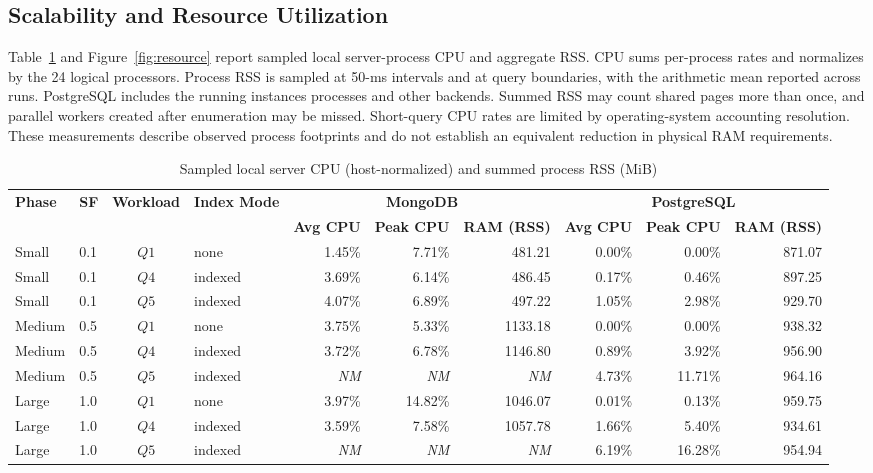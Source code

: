 \documentclass[10pt,a4paper,twocolumn]{article}
\begin{document}
\subsection{Scalability and Resource Utilization}
Table~\ref{tab:resources} and Figure~\ref{fig:resource} report sampled local server-process CPU and aggregate RSS. CPU sums per-process rates and normalizes by the 24 logical processors. Process RSS is sampled at 50-ms intervals and at query boundaries, with the arithmetic mean reported across runs. PostgreSQL includes the running instance\textquotesingle s processes and other backends. Summed RSS may count shared pages more than once, and parallel workers created after enumeration may be missed. Short-query CPU rates are limited by operating-system accounting resolution. These measurements describe observed process footprints and do not establish an equivalent reduction in physical RAM requirements.

\begin{table}[t]
\caption{Sampled local server CPU (host-normalized) and summed process RSS (MiB)}
\label{tab:resources}
\centering\small
\renewcommand{\arraystretch}{1.2}
\begin{adjustbox}{max width=\textwidth}
\begin{tabular}{@{}llclrrrrrr@{}}
\toprule
\textbf{Phase} & \textbf{SF} & \textbf{Workload} & \textbf{Index Mode}
  & \multicolumn{3}{c}{\textbf{MongoDB}}
  & \multicolumn{3}{c}{\textbf{PostgreSQL}} \\
\cmidrule(lr){5-7}\cmidrule(lr){8-10}
 & & & & \textbf{Avg CPU} & \textbf{Peak CPU} & \textbf{RAM (RSS)}
   & \textbf{Avg CPU} & \textbf{Peak CPU} & \textbf{RAM (RSS)} \\ \midrule
Small & 0.1 & $Q1$ & none & 1.45\% & 7.71\% & 481.21 & 0.00\% & 0.00\% & 871.07 \\
Small & 0.1 & $Q4$ & indexed & 3.69\% & 6.14\% & 486.45 & 0.17\% & 0.46\% & 897.25 \\
Small & 0.1 & $Q5$ & indexed & 4.07\% & 6.89\% & 497.22 & 1.05\% & 2.98\% & 929.70 \\
Medium & 0.5 & $Q1$ & none & 3.75\% & 5.33\% & 1133.18 & 0.00\% & 0.00\% & 938.32 \\
Medium & 0.5 & $Q4$ & indexed & 3.72\% & 6.78\% & 1146.80 & 0.89\% & 3.92\% & 956.90 \\
Medium & 0.5 & $Q5$ & indexed & \textit{NM} & \textit{NM} & \textit{NM} & 4.73\% & 11.71\% & 964.16 \\
Large & 1.0 & $Q1$ & none & 3.97\% & 14.82\% & 1046.07 & 0.01\% & 0.13\% & 959.75 \\
Large & 1.0 & $Q4$ & indexed & 3.59\% & 7.58\% & 1057.78 & 1.66\% & 5.40\% & 934.61 \\
Large & 1.0 & $Q5$ & indexed & \textit{NM} & \textit{NM} & \textit{NM} & 6.19\% & 16.28\% & 954.94 \\
\bottomrule
\end{tabular}
\end{adjustbox}
\end{table}
\end{document}
